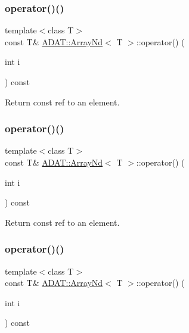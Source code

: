 \subsubsection{\texorpdfstring{operator()()}{operator()()}\hspace{0.1cm}{\footnotesize\ttfamily [4/24]}}
{\footnotesize\ttfamily template$<$class T$>$ \\
const T\& \mbox{\hyperlink{classADAT_1_1ArrayNd}{A\+D\+A\+T\+::\+Array\+Nd}}$<$ T $>$\+::operator() (\begin{DoxyParamCaption}\item[{int}]{i }\end{DoxyParamCaption}) const\hspace{0.3cm}{\ttfamily [inline]}}



Return const ref to an element. 

\mbox{\label{classADAT_1_1ArrayNd_a0b16b5d4f7eed2684623a9c1dbcfeebe}} 
\subsubsection{\texorpdfstring{operator()()}{operator()()}\hspace{0.1cm}{\footnotesize\ttfamily [5/24]}}
{\footnotesize\ttfamily template$<$class T$>$ \\
const T\& \mbox{\hyperlink{classADAT_1_1ArrayNd}{A\+D\+A\+T\+::\+Array\+Nd}}$<$ T $>$\+::operator() (\begin{DoxyParamCaption}\item[{int}]{i }\end{DoxyParamCaption}) const\hspace{0.3cm}{\ttfamily [inline]}}



Return const ref to an element. 

\mbox{\label{classADAT_1_1ArrayNd_a0b16b5d4f7eed2684623a9c1dbcfeebe}} 
\subsubsection{\texorpdfstring{operator()()}{operator()()}\hspace{0.1cm}{\footnotesize\ttfamily [6/24]}}
{\footnotesize\ttfamily template$<$class T$>$ \\
const T\& \mbox{\hyperlink{classADAT_1_1ArrayNd}{A\+D\+A\+T\+::\+Array\+Nd}}$<$ T $>$\+::operator() (\begin{DoxyParamCaption}\item[{int}]{i }\end{DoxyParamCaption}) const\hspace{0.3cm}{\ttfamily [inline]}}



